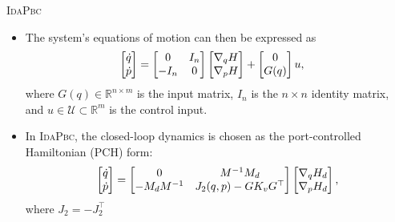 \begin{frame}{\textsc{IdaPbc}} 
  \begin{itemize}
    \item The system's equations of motion can then be expressed as 
    \begin{align}
        \begin{split}  
          \bmat{\dot{q} \\ \dot{p}} &= \bmat{0 & I_n \\ -I_n & 0}\bmat{\nabla_qH \\
          \nabla_pH} + \bmat{0 \\ G(q)}u,
        \end{split}
        \label{eq:hamiltonian_dynamics}
    \end{align}
    where $G(q) \in \mathbb{R}^{n \times m}$ is the input matrix, $I_n$ is the
    $n \times n$ identity matrix, and $u \in \mathcal{U} \subset \mathbb{R}^m$ is
    the control input.
    \item In \textsc{IdaPbc}, the closed-loop dynamics is
    chosen as the port-controlled Hamiltonian (PCH) form:
    \begin{equation}
      \bmat{\dot{q} \\ \dot{p}}
      =
      \bmat{0 & M^{-1}M_d \\ -M_dM^{-1} & J_2(q,p) - GK_vG^\top}
      \bmat{\nabla_q H_d \\ \nabla_p H_d},
      \label{eq:pch}
    \end{equation}
    where $J_2 = -J_2^\top$
  \end{itemize}
  
\end{frame}

